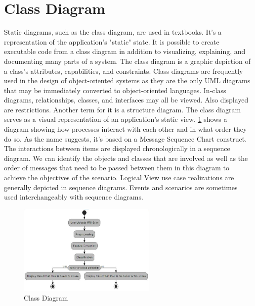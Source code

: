 \section{Class Diagram}

Static diagrams, such as the class diagram, are used in textbooks. It's a representation of the application's "static" state. It is possible to create executable code from a class diagram in addition to visualizing, explaining, and documenting many parts of a system. The class diagram is a graphic depiction of a class's attributes, capabilities, and constraints. Class diagrams are frequently used in the design of object-oriented systems as they are the only UML diagrams that may be immediately converted to object-oriented languages. In-class diagrams, relationships, classes, and interfaces may all be viewed. Also displayed are restrictions. Another term for it is a structure diagram. The class diagram serves as a visual representation of an application's static view. \ref{fig:class_diagram_example} shows a diagram showing how processes interact with each other and in what order they do so. As the name suggests, it's based on a Message Sequence Chart construct. The interactions between items are displayed chronologically in a sequence diagram. We can identify the objects and classes that are involved as well as the order of messages that need to be passed between them in this diagram to achieve the objectives of the scenario. Logical View use case realizations are generally depicted in sequence diagrams. Events and scenarios are sometimes used 
interchangeably with sequence diagrams. 

\begin{figure}
    \centering
    \includegraphics[width=0.60\textwidth]{Img/Chap-01/12.jpg}
    \caption{Class Diagram}
    \label{fig:class_diagram_example}
\end{figure}